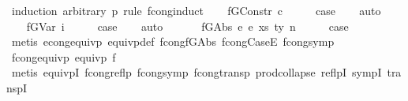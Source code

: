 \begin{isabellebody}
%
\isadelimproof
%
\endisadelimproof
%
\isatagproof
{}\isamarkupfalse%
\ {\isacharparenleft}{\kern0pt}induction\ arbitrary{\isacharcolon}{\kern0pt}\ p{}\ rule{\isacharcolon}{\kern0pt}\ fcong{\isachardot}{\kern0pt}induct{\isacharparenright}{\kern0pt}\isanewline
\ \ \isamarkupfalse%
\ {\isacharparenleft}{\kern0pt}f{\isacharunderscore}{\kern0pt}GConstr\ c{\isacharparenright}{\kern0pt}\isanewline
\ \ \isamarkupfalse%
\ \isamarkupfalse%
\ {\isacharquery}{\kern0pt}case\isanewline
\ \ \isamarkupfalse%
\ auto\isanewline
\ \ \isamarkupfalse%
\isanewline
{}\isamarkupfalse%
\isanewline
\ \ \isamarkupfalse%
\ {\isacharparenleft}{\kern0pt}f{\isacharunderscore}{\kern0pt}GVar\ i{\isacharparenright}{\kern0pt}\isanewline
\ \ \isamarkupfalse%
\ \isamarkupfalse%
\ {\isacharquery}{\kern0pt}case\isanewline
\ \ \isamarkupfalse%
\ auto\isanewline
\ \ \isamarkupfalse%
\isanewline
{}\isamarkupfalse%
\isanewline
\ \ \isamarkupfalse%
\ {\isacharparenleft}{\kern0pt}f{\isacharunderscore}{\kern0pt}GAbs\ e{}\ e{}\ xs\ ty\ n{\isacharparenright}{\kern0pt}\isanewline
\ \ \isamarkupfalse%
\ \isamarkupfalse%
\ {\isacharquery}{\kern0pt}case\isanewline
\ \ \isamarkupfalse%
\ {\isacharparenleft}{\kern0pt}metis\ econg{\isacharunderscore}{\kern0pt}equivp\ equivp{\isacharunderscore}{\kern0pt}def\ fcong{\isachardot}{\kern0pt}f{\isacharunderscore}{\kern0pt}GAbs\ fcong{\isacharunderscore}{\kern0pt}CaseE\ fcong{\isacharunderscore}{\kern0pt}symp{\isacharparenright}{\kern0pt}\isanewline
{}\isamarkupfalse%
%
\endisatagproof
{\isafoldproof}%
%
\isadelimproof
\isanewline
%
\endisadelimproof
\isanewline
\isanewline
{}\isamarkupfalse%
\ fcong{\isacharunderscore}{\kern0pt}equivp{\isacharcolon}{\kern0pt}\ {\isachardoublequoteopen}equivp\ {\isacharparenleft}{\kern0pt}{\isasymsimeq}f{\isacharparenright}{\kern0pt}{\isachardoublequoteclose}\isanewline
%
\isadelimproof
\ \ %
\endisadelimproof
%
\isatagproof
{}\isamarkupfalse%
\ {\isacharparenleft}{\kern0pt}metis\ equivpI\ fcong{\isacharunderscore}{\kern0pt}reflp\ fcong{\isacharunderscore}{\kern0pt}symp\ fcong{\isacharunderscore}{\kern0pt}transp\ prod{\isachardot}{\kern0pt}collapse\ reflpI\ sympI\ transpI{\isacharparenright}{\kern0pt}%
\endisatagproof

\end{isabellebody}
